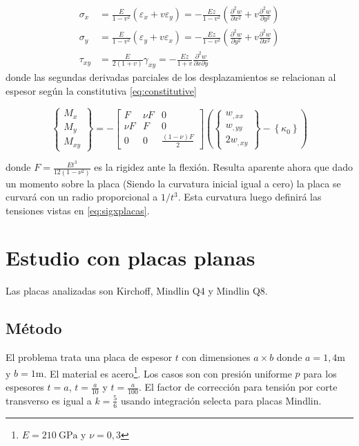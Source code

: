 \documentclass[onecolumn,10pt,titlepage]{article}
\begin{document}
\begin{align} \sigma_{x} &=\frac{E}{1-v^{2}}\left(\varepsilon_{x}+v \varepsilon_{y}\right)=-\frac{E z}{1-v^{2}}\left(\frac{\partial^{2} w}{\partial x^{2}}+v \frac{\partial^{2} w}{\partial y^{2}}\right) \label{eq:sigxplacas}\\ \sigma_{y} &=\frac{E}{1-v^{2}}\left(\varepsilon_{y}+v \varepsilon_{x}\right)=-\frac{E z}{1-v^{2}}\left(\frac{\partial^{2} w}{\partial y^{2}}+v \frac{\partial^{2} w}{\partial x^{2}}\right) \\ \tau_{x y} &=\frac{E}{2(1+v)} \gamma_{x y}=-\frac{E z}{1+v} \frac{\partial^{2} w}{\partial x \partial y} 
\end{align}
donde las segundas derivadas parciales de los desplazamientos se relacionan al espesor según la constitutiva \ref{eq:constitutive}

\begin{equation} \label{eq:constitutive}
\left\{\begin{array}{l}{M_{x}} \\ {M_{y}} \\ {M_{x y}}\end{array}\right\} =- \left[ \begin{array}{ccc}{F} & {\nu F} & {0} \\ {\nu F} & {F} & {0} \\ {0} & {0} & {\frac{(1-\nu) F}{2}}\end{array}\right] \left(\left\{\begin{array}{l}{w_{,x x}} \\ {w_{,y y}} \\ {2 w_{,x y}}\end{array}\right\}-\left\{\kappa_{0}\right\} \right)
\end{equation}

donde $F=\frac{E t^{3}}{12\left(1-\nu^{2}\right)}$ es la rigidez ante la flexión. Resulta aparente ahora que dado un momento sobre la placa (Siendo la curvatura inicial igual a cero) la placa se curvará con un radio proporcional a $1/t^3$. Esta curvatura luego definirá las tensiones vistas en \eqref{eq:sigxplacas}. 

\section{Estudio con placas planas}
Las placas analizadas son Kirchoff, Mindlin Q4 y Mindlin Q8.

\subsection{Método}
El problema trata una placa de espesor $t$ con dimensiones $a\times b$ donde $a=1,4\si{\meter}$ y $b=1\si{\meter}$. El material es acero\footnote{$E=\SI{210}{\giga \pascal}$ y $\nu=0,3$}. Los casos son con presión uniforme $p$ para los espesores $t=a$, $t=\frac{a}{10}$ y $t=\frac{a}{100}$. El factor de corrección para tensión por corte transverso es igual a $k=\frac{5}{6}$ usando integración selecta\citep{cook2007concepts} para placas Mindlin.
\end{document}
